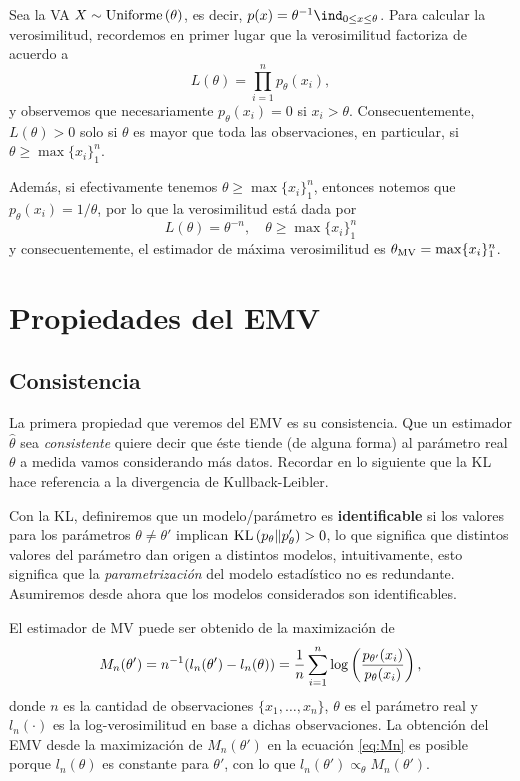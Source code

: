 \begin{example}
	Sea la VA $X\sim\text{Uniforme}\left(\theta\right)$, es decir, $p(x) = \theta^{-1} \ind_{0\leq x \leq \theta}$. Para calcular la verosimilitud, recordemos en primer lugar que la verosimilitud factoriza de acuerdo a  
	\begin{equation}
		L(\theta) = \prod_{i=1}^n p_\theta(x_i),
	\end{equation}
	y observemos que necesariamente $p_\theta(x_i) = 0$ si $x_i>\theta$. Consecuentemente, $L(\theta)>0$ solo si $\theta$ es mayor que toda las observaciones, en particular, si $\theta\geq\max\{x_i\}_1^n$.

	Además, si efectivamente tenemos $\theta\geq\max\{x_i\}_1^n$, entonces notemos que $p_\theta(x_i) = 1/\theta$, por lo que la verosimilitud está dada por
		\begin{equation}
		L(\theta) = \theta^{-n}, \quad \theta\geq\max\{x_i\}_1^n
	\end{equation}
	y consecuentemente, el estimador de máxima verosimilitud es ${\theta_\text{MV}} = \max\{x_i\}_1^n$.
\end{example}

\section{Propiedades del EMV} 
\label{sec:propiedades_EMV}

\subsection{Consistencia} 

La primera propiedad que veremos del EMV es su consistencia. Que un estimador $\hat\theta$ sea \textit{consistente} quiere decir que éste tiende (de alguna forma) al parámetro real $\theta$ a medida vamos considerando más datos. Recordar en lo siguiente que la KL hace referencia a la divergencia de Kullback-Leibler.


 Con la KL, definiremos que un modelo/parámetro es \textbf{identificable} si los valores para los parámetros $\theta\neq\theta'$ implican $\text{KL}\left(p_\theta\middle\|p_\theta'\right)>0$, lo que significa que distintos valores del parámetro dan origen a distintos modelos, intuitivamente, esto significa que la \emph{parametrización} del modelo estadístico no es redundante. Asumiremos desde ahora que los modelos considerados son identificables.

El estimador de MV puede ser obtenido de la maximización de
\begin{equation}
\label{eq:Mn}
 	M_n (\theta') = n^{-1} (l_n(\theta') - l_n(\theta))  = \frac{1}{n} \sum_{i=1}^n \log\left(\frac{p_{\theta'}(x_i)}{p_{\theta}(x_i)}\right),
 \end{equation} 
 donde $n$ es la cantidad de observaciones $\{x_1,\ldots,x_n\}$, $\theta$ es el parámetro real y $l_n(\cdot)$ es la log-verosimilitud en base a dichas observaciones. La obtención del EMV desde la maximización de $M_n (\theta')$ en la ecuación \eqref{eq:Mn} es posible porque $l_n(\theta)$ es constante para $\theta'$, con lo que $l_n(\theta')\propto_{\theta}M_n (\theta')$. 
 
